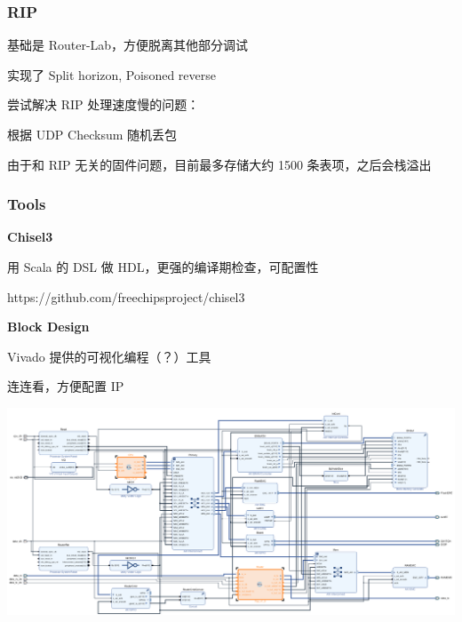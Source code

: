 \documentclass[UTF-8]{ctexbeamer}
\begin{document}
\begin{frame}
  \frametitle{RIP}

  基础是 Router-Lab，方便脱离其他部分调试

  实现了 Split horizon, Poisoned reverse
  
  \pause
  
  \vspace{1em}

  尝试解决 RIP 处理速度慢的问题：

  根据 UDP Checksum 随机丢包

  \pause
  
  \vspace{1em}

  由于和 RIP 无关的固件问题，目前最多存储大约 1500 条表项，之后会栈溢出

\end{frame}

\begin{frame}
  \frametitle{Tools}

  \textbf{Chisel3}

  用 Scala 的 DSL 做 HDL，更强的编译期检查，可配置性

  https://github.com/freechipsproject/chisel3

  \pause

  \vspace{1em}

  \textbf{Block Design}

  Vivado 提供的可视化编程（？）工具

  连连看，方便配置 IP
\end{frame}

\begin{frame}
  \includegraphics[width=\textwidth]{assets/bd.png}
\end{frame}
\end{document}
